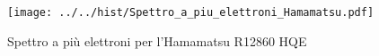 \begin{figure}[h] \centering \texttt{[image: ../../hist/Spettro\_a\_piu\_elettroni\_Hamamatsu.pdf]}\caption{Spettro a più elettroni per l'Hamamatsu R12860 HQE}\label{hist:Spettro_a_piu_elettroni_Hamamatsu} \end{figure}
